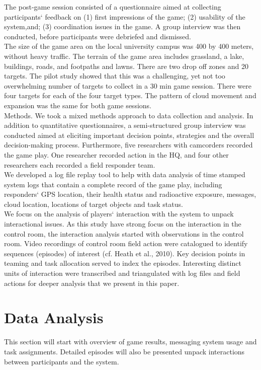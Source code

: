 The post-game session consisted of a questionnaire aimed at collecting participants` feedback on (1) first impressions of the game; (2) usability of the system,and; (3) coordination issues in the game. A group interview was then conducted, before participants were debriefed and dismissed.\\

The size of the game area on the local university campus was 400 by 400 meters, without heavy traffic. The terrain of the game area includes grassland, a lake, buildings, roads, and footpaths and lawns. There are two drop off zones and 20 targets. The pilot study showed that this was a challenging, yet not too overwhelming number of targets to collect in a 30 min game session. There were four targets for each of the four target types. The pattern of cloud movement and expansion was the same for both game sessions.\\

Methods. We took a mixed methods approach to data collection and analysis. In addition to quantitative questionnaires, a semi-structured group interview was conducted aimed at eliciting important decision points, strategies and the overall decision-making process. Furthermore, five researchers with camcorders recorded the game play. One researcher recorded action in the HQ, and four other researchers each recorded a field responder team.\\

We developed a log file replay tool to help with data analysis of time stamped system logs that contain a complete record of the game play, including responders` GPS location, their health status and radioactive exposure, messages, cloud location, locations of target objects and task status.\\

We focus on the analysis of players` interaction with the system to unpack interactional issues. As this study have strong focus on the interaction in the control room, the interaction analysis started with observations in the control room. Video recordings of control room field action were catalogued to identify sequences (episodes) of interest (cf. Heath et al., 2010). Key decision points in teaming and task allocation served to index the episodes. Interesting distinct units of interaction were transcribed and triangulated with log files and field actions for deeper analysis that we present in this paper.\\


\section{Data Analysis}
This section will start with overview of game results, messaging system usage and task assignments. Detailed episodes will also be presented unpack interactions between participants and the system.\\


